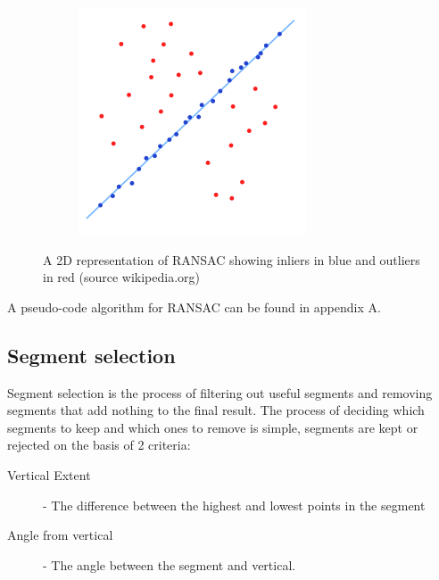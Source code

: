 \begin{figure}[H]
\begin{subfigure}{.5\textwidth}
						\includegraphics[width=1\linewidth]{Includes/images/random_sample_example2}
						\label{fig:RANSAC2}
					\end{subfigure}
					\caption{A 2D representation of RANSAC showing inliers in blue and outliers in red (source wikipedia.org)}
				\end{figure} 
			 
				
				A pseudo-code algorithm for RANSAC can be found in appendix A.
		\subsection{Segment selection}
			Segment selection is the process of filtering out useful segments and removing segments that add nothing to the final result. The process of deciding which segments to keep and which ones to remove is simple, segments are kept or rejected on the basis of 2 criteria:
			
			\begin{description}
				\item[Vertical Extent] - The  difference between the highest and lowest points in the segment
				\item[Angle from vertical] - The angle between the segment and vertical.
			\end{description}
			
